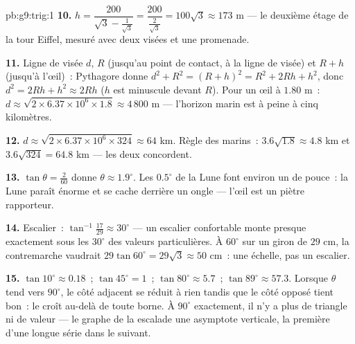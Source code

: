 \begin{solution}{pb:g9:trig:1}
\textbf{10.} $h = \dfrac{200}{\sqrt3 - \frac{1}{\sqrt3}}
= \dfrac{200}{\frac{2}{\sqrt3}} = 100\sqrt3 \approx 173$ m --- le
deuxième étage de la tour Eiffel, mesuré avec deux visées et une
promenade.

\textbf{11.} Ligne de visée $d$,  $R$ (jusqu'au point de
contact,  à la ligne de visée) et $R + h$ (jusqu'à
l'œil)~: Pythagore donne $d^2 + R^2 = (R + h)^2 = R^2 + 2Rh + h^2$,
donc $d^2 = 2Rh + h^2 \approx 2Rh$ ($h$ est minuscule devant $R$).
Pour un œil à $1.80$ m~:
$d \approx \sqrt{2 \times 6.37 \times 10^6 \times 1.8}
\approx 4\,800$ m --- l'horizon marin est à peine à cinq
kilomètres.

\textbf{12.} $d \approx \sqrt{2 \times 6.37 \times 10^6 \times
324} \approx 64$ km. Règle des marins~: $3.6\sqrt{1.8} \approx
4.8$ km et $3.6\sqrt{324} = 64.8$ km --- les deux concordent.

\textbf{13.} $\tan\theta = \frac{2}{60}$ donne
$\theta \approx 1.9^\circ$. Les $0.5^\circ$ de la Lune font environ
un \emph{} de pouce~: la Lune paraît énorme et se cache
derrière un ongle --- l'œil est un piètre rapporteur.

\textbf{14.} Escalier~: $\tan^{-1}\frac{17}{29} \approx 30^\circ$
--- un escalier confortable monte presque exactement sous les
$30^\circ$ des valeurs particulières. À $60^\circ$ sur un giron de
$29$ cm, la contremarche vaudrait
$29\tan 60^\circ = 29\sqrt3 \approx 50$ cm~: une échelle, pas un
escalier.

\textbf{15.} $\tan 10^\circ \approx 0.18$~;
$\tan 45^\circ = 1$~; $\tan 80^\circ \approx 5.7$~;
$\tan 89^\circ \approx 57.3$. Lorsque $\theta$ tend vers
$90^\circ$, le côté adjacent se réduit à rien tandis que le côté
opposé tient bon~: le  croît au-delà de toute borne. À
$90^\circ$ exactement, il n'y a plus de triangle ni de valeur --- le
graphe de la  escalade une asymptote verticale, la première
d'une longue série dans le  suivant.
\end{solution}
